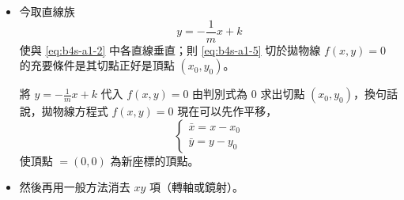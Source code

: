 \begin{itemize}[leftmargin=2em]
  \item[（二）] 今取直線族
  \begin{equation}
  y = -\frac{1}{m}x+k \label{eq:b4s-a1-5}
  \end{equation}
  使與 \eqref{eq:b4s-a1-2} 中各直線垂直；則 \eqref{eq:b4s-a1-5} 切於拋物線 $f(x, y)=0$ 的充要條件是其切點正好是頂點 $(x_0, y_0)$。

  將 $y = -\frac{1}{m}x+k$ 代入 $f(x, y)=0$ 由判別式為 0 求出切點 $(x_0, y_0)$，換句話說，拋物線方程式 $f(x, y)=0$ 現在可以先作平移，
  \[
  \begin{cases}
  \bar{x} = x - x_0 \\
  \bar{y} = y - y_0
  \end{cases}
  \]
  使頂點 $=(0, 0)$ 為新座標的頂點。

  \item[（三）] 然後再用一般方法消去 $xy$ 項（轉軸或鏡射）。
\end{itemize}


